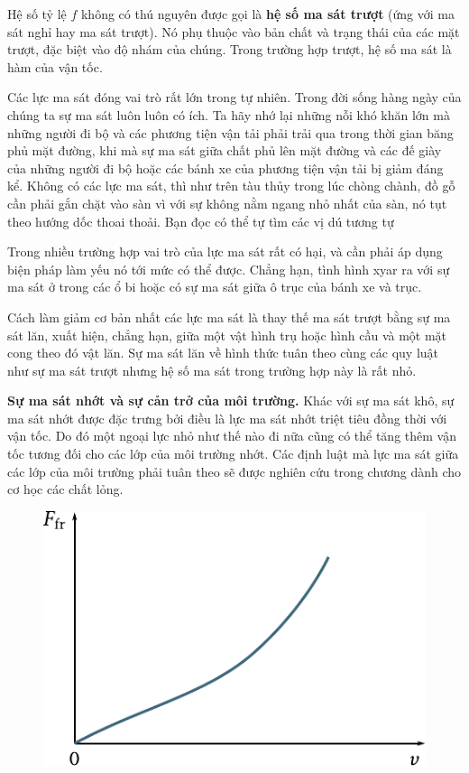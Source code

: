 \noindent
Hệ số tỷ lệ $f$ không có thú nguyên được gọi là \textbf{hệ số ma sát trượt} (ứng với ma sát nghỉ hay ma sát trượt). Nó phụ thuộc vào bản chất và trạng thái của các mặt trượt, đặc biệt vào độ nhám của chúng. Trong trường hợp trượt, hệ số ma sát là hàm của vận tốc.

Các lực ma sát đóng vai trò rất lớn trong tự nhiên. Trong đời sống hàng ngày của chúng ta sự ma sát luôn luôn có ích. Ta hãy nhớ lại những nỗi khó khăn lớn mà những người đi bộ và các phương tiện vận tải phải trải qua trong thời gian băng phủ mặt đường, khi mà sự ma sát giữa chất phủ lên mặt đường và các đế giày của những người đi bộ hoặc các bánh xe của phương tiện vận tải bị giảm đáng kể. Không có các lực ma sát, thì như trên tàu thủy trong lúc chòng chành, đồ gỗ cần phải gắn chặt vào sàn vì với sự không nằm ngang nhỏ nhất của sàn, nó tụt theo hướng dốc thoai thoải. Bạn đọc có thể tự tìm các vị dú tương tự

Trong nhiều trường hợp vai trò của lực ma sát rất có hại, và cần phải áp dụng biện pháp làm yếu nó tới mức có thể được. Chẳng hạn, tình hình xyar ra với sự ma sát ở trong các ổ bi hoặc có sự ma sát giữa ô trục của bánh xe và trục.

Cách làm giảm cơ bản nhất các lực ma sát là thay thế ma sát trượt bằng sự ma sát lăn, xuất hiện, chẳng hạn, giữa một vật hình trụ hoặc hình cầu và một mặt cong theo đó vật lăn. Sự ma sát lăn về hình thức tuân theo cùng các quy luật như sự ma sát trượt nhưng hệ số ma sát trong trường hợp này là rất nhỏ.

\textbf{Sự ma sát nhớt và sự cản trở của môi trường.} Khác với sự ma sát khô, sự ma sát nhớt được đặc trưng bởi điều là lực ma sát nhớt triệt tiêu đồng thời với vận tốc. Do đó một ngoại lực nhỏ như thế nào đi nữa cũng có thể tăng thêm vận tốc tương đối cho các lớp của môi trường nhớt. Các định luật mà lực ma sát giữa các lớp của môi trường phải tuân theo sẽ được nghiên cứu trong chương dành cho cơ học các chất lỏng.

\begin{figure}[!htb]
	\begin{center}
		\includegraphics[scale=1]{figures/ch_02/fig_2_10.pdf}
		\caption[]{}
		\label{fig:2_10}
	\end{center}
\end{figure}

